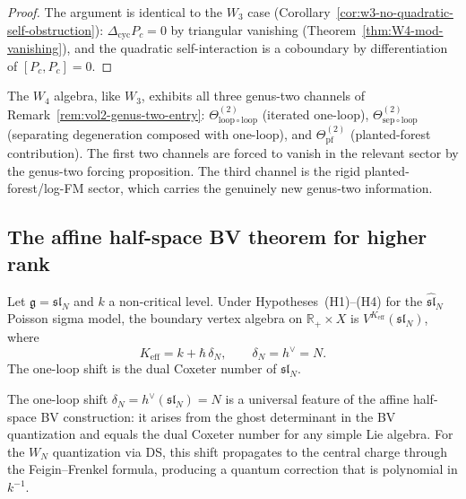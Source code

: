 \begin{proof}
The argument is identical to the $W_3$ case
(Corollary~\ref{cor:w3-no-quadratic-self-obstruction}):
$\Delta_{\mathrm{cyc}} P_c = 0$ by triangular vanishing
(Theorem~\ref{thm:W4-mod-vanishing}), and the quadratic
self-interaction is a coboundary by differentiation of
$[P_c, P_c] = 0$.
\end{proof}

\begin{remark}
The $W_4$ algebra, like $W_3$, exhibits all three genus-two channels
of Remark~\ref{rem:vol2-genus-two-entry}:
$\Theta^{(2)}_{\mathrm{loop}\circ\mathrm{loop}}$ (iterated one-loop),
$\Theta^{(2)}_{\mathrm{sep}\circ\mathrm{loop}}$ (separating degeneration
composed with one-loop), and
$\Theta^{(2)}_{\mathrm{pf}}$ (planted-forest contribution).
The first two channels are forced to vanish in the relevant sector
by the genus-two forcing proposition. The third channel is the
rigid planted-forest/log-FM sector, which carries the
genuinely new genus-two information.
\end{remark}

\subsection{The affine half-space BV theorem for higher rank}

\begin{theorem}
Let $\mathfrak{g} = \mathfrak{sl}_N$ and $k$ a non-critical level.
Under Hypotheses~(H1)--(H4) for the $\widehat{\mathfrak{sl}}_N$
Poisson sigma model, the boundary vertex algebra on
$\mathbb{R}_+ \times X$ is $V^{K_{\mathrm{eff}}}(\mathfrak{sl}_N)$,
where
\[
K_{\mathrm{eff}} = k + \hbar\,\delta_N,
\qquad
\delta_N = h^\vee = N.
\]
The one-loop shift is the dual Coxeter number of $\mathfrak{sl}_N$.
\end{theorem}

\begin{remark}
The one-loop shift $\delta_N = h^\vee(\mathfrak{sl}_N) = N$ is a universal
feature of the affine half-space BV construction: it arises from the
ghost determinant in the BV quantization and equals the dual Coxeter
number for any simple Lie algebra. For the $W_N$ quantization via DS,
this shift propagates to the central charge through the Feigin--Frenkel
formula, producing a quantum correction that is polynomial in $k^{-1}$.
\end{remark}

